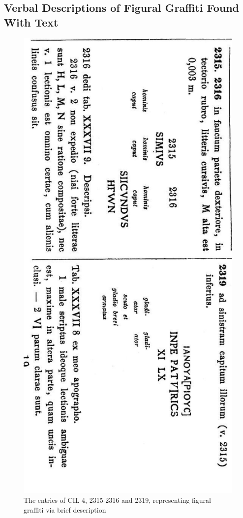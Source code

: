 \documentclass[amsthm,ebook]{saparticle}
\begin{document}
\subsection{Verbal Descriptions of Figural Graffiti Found With Text}

\begin{figure}[!bp]
\centering
 \includegraphics[width=\columnwidth]{EAGLE2016BenefielSypniewski-img002.jpg}
\caption{The entries of CIL 4, 2315-2316 and 2319, representing figural graffiti via brief description}
\label{fig:2}
\end{figure}
\end{document}

